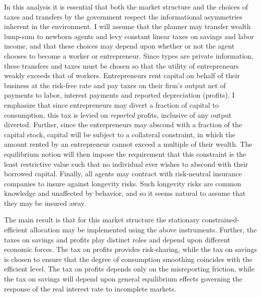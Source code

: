 \documentclass[11pt]{article}
\theoremstyle{plain}
\theoremstyle{definition} %
\begin{document}
In this analysis it is essential that both the market structure and the choices of taxes and transfers by the government respect the informational asymmetries inherent in the environment. I will assume that the planner may transfer wealth lump-sum to newborn agents and levy constant linear taxes on savings and labor income, and that these choices may depend upon whether or not the agent chooses to become a worker or entrepreneur. Since types are private information, these transfers and taxes must be chosen so that the utility of entrepreneurs weakly exceeds that of workers. Entrepreneurs rent capital on behalf of their business at the risk-free rate and pay taxes on their firm's output net of payments to labor, interest payments and reported depreciation (profits). I emphasize that since entrepreneurs may divert a fraction of capital to consumption, this tax is levied on \textit{reported} profits, inclusive of any output diverted. Further, since the entrepreneurs may abscond with a fraction of the capital stock, capital will be subject to a collateral constraint, in which the amount rented by an entrepreneur cannot exceed a multiple of their wealth. The equilibrium notion will then impose the requirement that this constraint is the least restrictive value such that no individual ever wishes to abscond with their borrowed capital. Finally, all agents may contract with risk-neutral insurance companies to insure against longevity risks. Such longevity risks are common knowledge and unaffected by behavior, and so it seems natural to assume that they may be insured away. 

The main result is that for this market structure the stationary constrained-efficient allocation may be implemented using the above instruments. Further, the taxes on savings and profits play distinct roles and depend upon different economic forces. The tax on profits provides risk-sharing, while the tax on savings is chosen to ensure that the degree of consumption smoothing coincides with the efficient level. The tax on profits depends only on the misreporting friction, while the tax on savings will depend upon general equilibrium effects governing the response of the real interest rate to incomplete markets. 
\end{document}
